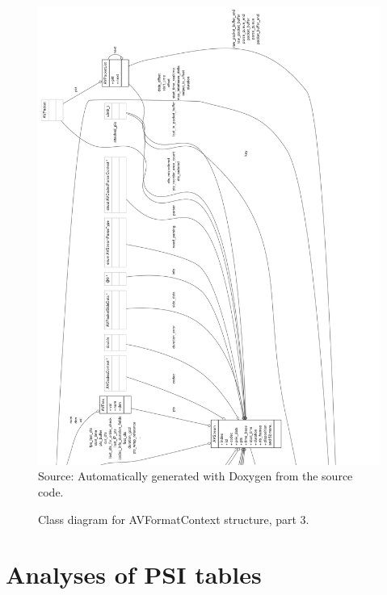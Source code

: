 \documentclass[
	12pt,				%
	openright,			%
	twoside,			%
	a4paper,			%
	brazil,
	french,				%
	english
	]{abntex2}
\begin{document}
\begin{apendicesenv}
\begin{figure}[!hb]
\centering
\caption{Class diagram for AVFormatContext structure, part 3.}
\includegraphics[width=0.9\linewidth]{figuras/structAVFormatContext__coll__graph_3.png}
\\Source: Automatically generated with Doxygen from the source code.
\label{fig:structAVFormatContext__coll__graph_3}
\end{figure}



\chapter{Analyses of PSI tables}
\label{pat_pmt_analysis}


\end{apendicesenv}
\end{document}
